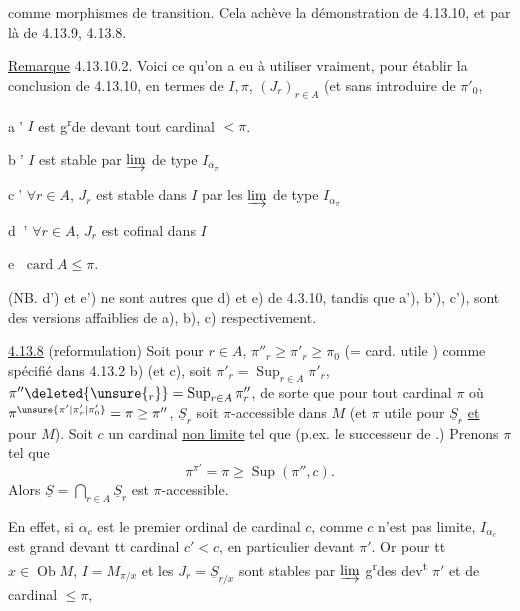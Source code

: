
comme  morphismes de transition.
Cela achève la démonstration de 4.13.10,
et par là de 4.13.9, 4.13.8.

\uline{Remarque} 4.13.10.2. Voici ce qu'on a eu
à utiliser vraiment, pour établir la
conclusion de 4.13.10, en termes de $I,\pi$,
$(J_r)_{r\in A}$ (et sans introduire de $\pi'_0$,\unsure{)}

\textcircled{a'} $I$ est g\textsuperscript{r}de devant tout cardinal  $<\pi$.

\textcircled{b'} $I$ est stable par $\varinjlim$ de type $I_{\alpha_\pi}$

\textcircled{c'} $\forall r\in A$, $J_r$ est stable dans $I$ par les
$\varinjlim$ de type $I_{\alpha_\pi}$

\textcircled{\textcircled{d'}} $\forall r\in A$, $J_r$ est cofinal dans $I$

\textcircled{e} $\operatorname{card}A\leq\pi$.

(NB. d') et e') ne sont autres que d) et e)
de 4.3.10, tandis que a'), b'), c'), sont
des versions affaiblies de a), b), c)
respectivement.

\uline{4.13.8} (reformulation) Soit pour $r\in A$, $\pi''_r\geq\pi'_r\geq\pi_0$ (= card. utile  )
comme spécifié dans 4.13.2 b) (et c),  soit $\pi'_r=\operatorname{Sup}_{r\in A}\pi'_r$, $\pi''\deleted{\unsure{{}_r}}=\operatorname{Sup}_{r\in A}\pi''_r$, de
sorte que pour tout cardinal $\pi$ où $\pi^{\unsure{\pi'|\pi'_r|\pi'_0}}=\pi\geq\pi''$, $\underline S_r$ soit $\pi$-accessible
dans $M$ (et $\pi$ utile pour $\underline S_r$ \uline{et} pour $M$). Soit $c$ un cardinal \uline{non
limite} tel que 
(p.ex.  le successeur de .) Prenons $\pi$ tel
que
\[
\pi^{\pi'}=\pi\geq\operatorname{Sup}(\pi'',c).
\]
Alors $\underline S=\bigcap_{r\in A}\underline S_r$ est $\pi$-accessible.

En effet, si $\alpha_c$ est le premier ordinal de cardinal $c$, comme $c$ n'est
pas limite, $I_{\alpha_c}$ est grand devant tt cardinal $c'<c$, en particulier
devant $\pi'$.  Or  pour tt $x\in\operatorname{Ob}M$, $I=M_{\pi/x}$ et les $J_r=\underline S_{r/x}$
sont stables par $\varinjlim$ g\textsuperscript{r}des dev\textsuperscript{t} $\pi'$ et de cardinal $\leq\pi$, 

